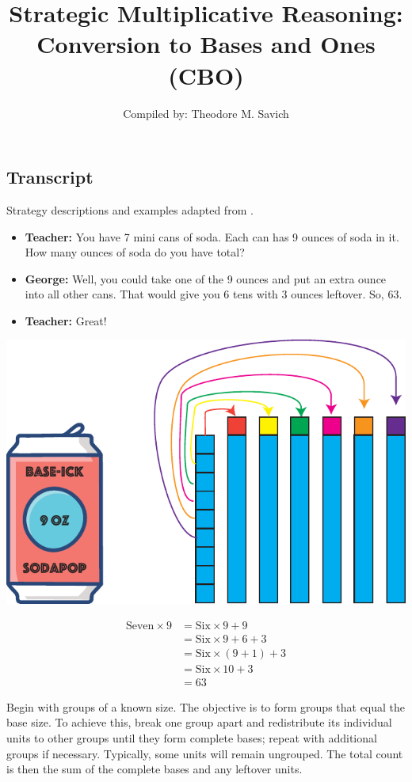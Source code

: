 \documentclass[11pt]{article}
\title{Strategic Multiplicative Reasoning: Conversion to Bases and Ones (CBO)}
\author{Compiled by: Theodore M. Savich}
\begin{document}
\maketitle
\subsection*{Transcript}
Strategy descriptions and examples adapted from \textcite{HackenbergCourseNotes}. 


\begin{itemize}
    \item \textbf{Teacher:} You have 7 mini cans of soda. Each can has 9 ounces of soda in it. How many
    ounces of soda do you have total?
    \item \textbf{George:}  Well, you could take one of the 9 ounces and put an extra ounce into all other
    cans. That would give you 6 tens with 3 ounces leftover. So, 63.
    \item \textbf{Teacher:} Great!
\end{itemize}


\includegraphics[width=.8\textwidth]{images/Easy_Pictures/SMR_CBO/PDF/SMR_CBO_Soda.pdf}

\begin{align*}
    \text{Seven} \times 9 &= \text{Six} \times 9 + 9  \\
    &=  \text{Six} \times 9 + 6 + 3 \\
    &= \text{Six}\times (9+1) +3  \\
    &= \text{Six}\times 10 + 3 \\
    &=63
    \end{align*}

Begin with groups of a known size. The objective is to form groups that equal the base size. To achieve this, break one group apart and redistribute its individual units to other groups until they form complete bases; repeat with additional groups if necessary. Typically, some units will remain ungrouped. The total count is then the sum of the complete bases and any leftover units.
\end{document}
